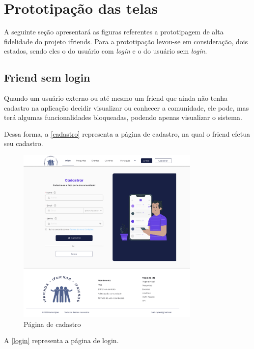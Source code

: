 \chapter{Prototipação das telas}
\label{prototipação}
A seguinte seção apresentará as figuras referentes a prototipagem de alta fidelidade do projeto \gls{ifriends}. Para a prototipação levou-se em consideração, dois estados, sendo eles o do usuário com \textit{login} e o do usuário sem \textit{login}. 

\section{Friend sem login}
Quando um usuário externo ou até mesmo um \gls{friend} que ainda não tenha cadastro na aplicação decidir visualizar ou conhecer a comunidade, ele pode, mas terá algumas funcionalidades bloqueadas, podendo apenas visualizar o sistema.

Dessa forma, a \autoref{cadastro} representa a página de cadastro, na qual o \gls{friend} efetua seu cadastro.

\begin{figure}[htb]
\centering
\caption{\label{cadastro} Página de cadastro}
\includegraphics[width=0.8\textwidth]{anexos/Imagens_Prototipo/intro/cadastro.png}
\end{figure}
\FloatBarrier

A \autoref{login} representa a página de login. 


